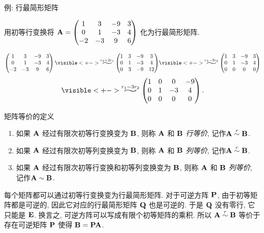 \begin{frame}{例: 行最简形矩阵}
	\onslide<+->
	\begin{example}
		用初等行变换将 ${\mathbf{A}}=\begin{pmatrix}
			1&3&-9&3\\
			0&1&-3&4\\
			-2&-3&9&6
		\end{pmatrix}$ 化为行最简形矩阵.
	\end{example}
	\onslide<+->
	\begin{solution}
		\[\begin{pmatrix}
			1&3&-9&3\\
			0&1&-3&4\\
			-2&-3&9&6
		\end{pmatrix}
		\visible<+->{\wsim{r_3+2r_1}{}\begin{pmatrix}
			1&3&-9&3\\
			0&1&-3&4\\
			0&3&-9&12
		\end{pmatrix}}
		\visible<+->{\wsim{
			r_3-3r_2}{}\begin{pmatrix}
				1&3&-9&3\\
				0&1&-3&4\\
				0&0&0&0
		\end{pmatrix}}\]\[
		\visible<+->{\wsim{
			r_1-3r_2}{}\begin{pmatrix}
				1&0&0&-9\\
				0&1&-3&4\\
				0&0&0&0
		\end{pmatrix}.}
		\]
	\end{solution}
\end{frame}


\begin{frame}{矩阵等价的定义}
	\onslide<+->
	\begin{definition}
		\begin{enumerate}
			\item 如果 ${\mathbf{A}}$ 经过有限次初等行变换变为 ${\mathbf{B}}$, 则称 ${\mathbf{A}}$ 和 ${\mathbf{B}}$ \emph{行等价}, 记作\emph{${\mathbf{A}}\mathrel{\overset{r}{\sim}}{\mathbf{B}}$}.
			\item 如果 ${\mathbf{A}}$ 经过有限次初等列变换变为 ${\mathbf{B}}$, 则称 ${\mathbf{A}}$ 和 ${\mathbf{B}}$ \emph{列等价}, 记作\emph{${\mathbf{A}}\mathrel{\overset{c}{\sim}}{\mathbf{B}}$}.
			\item 如果 ${\mathbf{A}}$ 经过有限次初等行变换和初等列变换变为 ${\mathbf{B}}$, 则称 ${\mathbf{A}}$ 和 ${\mathbf{B}}$ \emph{列等价}, 记作\emph{${\mathbf{A}}\sim{\mathbf{B}}$}.
		\end{enumerate}
	\end{definition}
	\onslide<+->
	每个矩阵都可以通过初等行变换变为行最简形矩阵.
	\onslide<+->
	对于可逆方阵 ${\mathbf{P}}$, 由于初等矩阵都是可逆的, 因此它对应的行最简形矩阵 ${\mathbf{Q}}$ 也是可逆的.
	\onslide<+->
	于是 ${\mathbf{Q}}$ 没有零行, 它只能是 ${\mathbf{E}}$.
	\onslide<+->
	换言之, \alert{可逆方阵可以写成有限个初等矩阵的乘积}.
	\onslide<+->
	所以 ${\mathbf{A}}\mathrel{\overset{r}{\sim}}{\mathbf{B}}$ 等价于存在可逆矩阵 ${\mathbf{P}}$ 使得 ${\mathbf{B}}={\mathbf{P}}{\mathbf{A}}$.
\end{frame}


